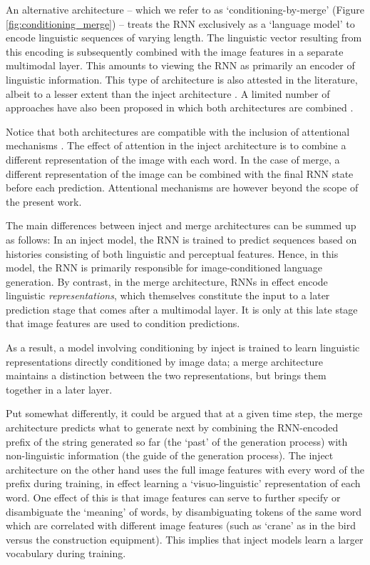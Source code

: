 \documentclass[11pt,letterpaper]{article}
\begin{document}
An alternative architecture -- which we refer to as `conditioning-by-merge' (Figure \ref{fig:conditioning_merge}) -- treats the RNN exclusively as a `language model' to encode linguistic sequences of varying length. The linguistic vector resulting from this encoding is subsequently combined with the image features in a separate multimodal layer. This amounts to viewing the RNN as primarily an encoder of linguistic information.
This type of architecture is also attested in the literature, albeit to a lesser extent than the inject architecture 
\cite{Mao2014,Mao2015,Mao2015a,Song2016,Hendricks2016,You2016}. 
A limited number of approaches have also been proposed in which both architectures are combined \cite{Lu2016,Xu2015}.

Notice that both architectures are compatible with the inclusion of attentional mechanisms \cite{Xu2015}. The effect of attention in the inject architecture is to combine a different representation of the image with each word. In the case of merge, a different representation of the image can be combined with the final RNN state before each prediction. Attentional mechanisms are however beyond the scope of the present work.

The main differences between inject and merge architectures can be summed up as follows: In an inject model, the RNN is trained to predict sequences based on histories consisting of both linguistic and perceptual features. Hence, in this model, the RNN is primarily responsible for image-conditioned language generation. By contrast, in the merge architecture, RNNs in effect encode linguistic {\em representations}, which themselves constitute the input to a later prediction stage that comes after a multimodal layer. It is only at this late stage that image features are used to condition predictions.

As a result, a model involving conditioning by inject is trained to learn linguistic representations directly conditioned by image data; a merge architecture maintains a distinction between the two representations, but brings them together in a later layer.

Put somewhat differently, it could be argued that at a given time step, the merge architecture predicts what to generate next by combining the RNN-encoded prefix of the string generated so far (the `past' of the generation process) with non-linguistic information (the guide of the generation process). The inject architecture on the other hand uses the full image features with every word of the prefix during training, in effect learning a `visuo-linguistic' representation of each word. One effect of this is that image features can serve to further specify or disambiguate the `meaning' of words, by disambiguating tokens of the same word which are correlated with different image features (such as `crane' as in the bird versus the construction equipment). This implies that inject models learn a larger vocabulary during training.
\end{document}
